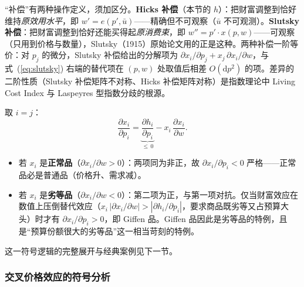 \begin{remark}
“补偿”有两种操作定义，须加区分。\textbf{Hicks 补偿}（本节的 $h$）：把财富调整到恰好维持\emph{原效用水平}，即 $w'=e(p',\bar u)$——精确但不可观察（$\bar u$ 不可观测）。\textbf{Slutsky 补偿}：把财富调整到恰好还能买得起\emph{原消费束}，即 $w''=p'\cdot x(p,w)$——可观察（只用到价格与数量），Slutsky（1915）原始论文用的正是这种。两种补偿一阶等价：对 $p_j$ 的微分，Slutsky 补偿给出的分解项为 $\partial x_i/\partial p_j+x_j\,\partial x_i/\partial w$，与式~(\ref{eq:slutsky}) 右端的替代项在 $(p,w)$ 处取值后相差 $O(\mathrm dp^2)$ 的项。差异的二阶性质（Slutsky 补偿矩阵不对称、Hicks 补偿矩阵对称）是指数理论中 Living Cost Index 与 Laspeyres 型指数分歧的根源。
\end{remark}

\begin{remark}[自身价格情形的符号分析]
取 $i=j$：
\[
 \frac{\partial x_i}{\partial p_i}
 =\underbrace{\frac{\partial h_i}{\partial p_i}}_{\le\,0}-x_i\,\frac{\partial x_i}{\partial w}.
\]
\begin{itemize}
\item 若 $x_i$ 是\textbf{正常品}（$\partial x_i/\partial w>0$）：两项同为非正，故 $\partial x_i/\partial p_i<0$ 严格——正常品必是普通品（价格升、需求减）。
\item 若 $x_i$ 是\textbf{劣等品}（$\partial x_i/\partial w<0$）：第二项为正，与第一项对抗。仅当财富效应在数值上压倒替代效应（$x_i\,|\partial x_i/\partial w|>|\partial h_i/\partial p_i|$，要求商品既劣等又占预算大头）时才有 $\partial x_i/\partial p_i>0$，即 Giffen 品。Giffen 品因此是劣等品的特例，且是“预算份额很大的劣等品”这一相当苛刻的特例。
\end{itemize}
这一符号逻辑的完整展开与经典案例见下一节。
\end{remark}

\subsubsection*{交叉价格效应的符号分析}

